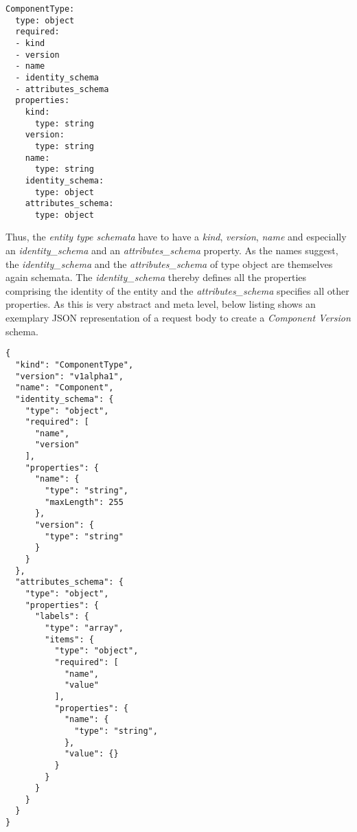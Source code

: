 \begin{lstlisting}[basicstyle=\tiny, caption=Entity Type Schema Schema, captionpos=b, label=lst:EntityTypeSchemaSchema]
ComponentType:
  type: object
  required:
  - kind
  - version
  - name
  - identity_schema
  - attributes_schema
  properties:
    kind: 
      type: string
    version:
      type: string
    name:
      type: string
    identity_schema:
      type: object
    attributes_schema:
      type: object
\end{lstlisting}

Thus, the \emph{entity type schemata} have to have a \emph{kind}, \emph{version}, \emph{name} and especially an \emph{identity\_schema} and an \emph{attributes\_schema} property. As the names suggest, the \emph{identity\_schema} and the \emph{attributes\_schema} of type object are themselves again schemata. The \emph{identity\_schema} thereby defines all the properties comprising the identity of the entity and the \emph{attributes\_schema} specifies all other properties. As this is very abstract and meta level, below listing shows an exemplary JSON representation of a request body to create a \emph{Component Version} schema. 

\begin{lstlisting}[basicstyle=\tiny, caption=Request Body for Component Version Schema Creation, captionpos=b, label=lst:ComponentVersionSchemaCreation]
{
  "kind": "ComponentType",
  "version": "v1alpha1",
  "name": "Component",
  "identity_schema": {
    "type": "object",
    "required": [
      "name",
      "version"
    ],
    "properties": {
      "name": {
        "type": "string",
        "maxLength": 255
      },
      "version": {
        "type": "string"
      }
    }
  },
  "attributes_schema": {
    "type": "object",
    "properties": {
      "labels": {
        "type": "array",
        "items": {
          "type": "object",
          "required": [
            "name",
            "value"
          ],
          "properties": {
            "name": {
              "type": "string",
            },
            "value": {}
          }
        }  
      }
    }
  }
}
\end{lstlisting}

